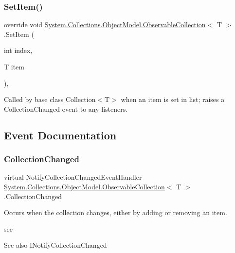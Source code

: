 \subsubsection{\texorpdfstring{Set\+Item()}{SetItem()}}
{\footnotesize\ttfamily override void \hyperlink{class_system_1_1_collections_1_1_object_model_1_1_observable_collection}{System.\+Collections.\+Object\+Model.\+Observable\+Collection}$<$ T $>$.Set\+Item (\begin{DoxyParamCaption}\item[{int}]{index,  }\item[{T}]{item }\end{DoxyParamCaption})\hspace{0.3cm}{\ttfamily [inline]}, {\ttfamily [protected]}}



Called by base class Collection$<$T$>$ when an item is set in list; raises a Collection\+Changed event to any listeners. 



\subsection{Event Documentation}
\mbox{\label{class_system_1_1_collections_1_1_object_model_1_1_observable_collection_af4a88823a7235293115b1d962f2dcc12}} 
\subsubsection{\texorpdfstring{Collection\+Changed}{CollectionChanged}}
{\footnotesize\ttfamily virtual Notify\+Collection\+Changed\+Event\+Handler \hyperlink{class_system_1_1_collections_1_1_object_model_1_1_observable_collection}{System.\+Collections.\+Object\+Model.\+Observable\+Collection}$<$ T $>$.Collection\+Changed}



Occurs when the collection changes, either by adding or removing an item. 

see \begin{DoxySeeAlso}{See also}
I\+Notify\+Collection\+Changed


\end{DoxySeeAlso}
\mbox{\label{class_system_1_1_collections_1_1_object_model_1_1_observable_collection_a46a49f1d912c470379aaa46991277bb8}} 
